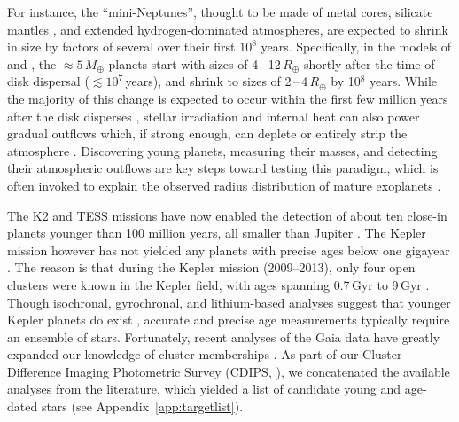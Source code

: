 \documentclass[12pt,modern,twocolumn,tighten,linenumbers]{aastex63}
\begin{document}
For instance, the ``mini-Neptunes'', thought to be made of metal
cores, silicate mantles \citep{kite_atmosphere_2020}, and extended
hydrogen-dominated atmospheres, are expected to shrink
in size by factors of several over their first $10^8$ years.
Specifically, in the models of \citet{owen_atmospheres_2016} and
\citet{owen_constraining_2020}, the $\approx$$5\,M_\oplus$ planets start
with sizes of 4\,--\,12\,$R_\oplus$ shortly after the time of disk
dispersal ($\lesssim$$10^7$\,years), and shrink to sizes of
2\,--\,4\,$R_\oplus$ by 10$^8$ years.  While the majority of this change
is expected to occur within the first few million years after the disk
disperses \citep{ikoma_situ_2012}, stellar
irradiation and internal heat can also power gradual outflows
which, if strong enough, can deplete or entirely strip the atmosphere \citep{lopez_how_2012,Owen_Wu_2013,ginzburg_corepowered_2018}. Discovering young planets, measuring their masses, and detecting their
atmospheric outflows are key steps toward testing this paradigm, which
is often invoked to explain the observed radius distribution of mature
exoplanets \citep{Fulton_et_al_2017,van_eylen_asteroseismic_2018}.

The K2 and TESS missions have now enabled the detection of about ten
close-in planets younger than 100 million years, all smaller than
Jupiter
\citep{Mann_K2_33b_2016,David_et_al_2017,david_four_2019,newton_tess_2019,bouma_cluster_2020,plavchan_planet_2020,rizzuto_tess_2020,martioli_aumicbc_2021}.
The Kepler mission however has not yielded any planets with precise
ages below one gigayear \citep{Meibom_et_al_2013}.  The reason is that
during the  Kepler mission (2009--2013), only four open clusters
were known in the Kepler field,
with ages spanning 0.7\,Gyr to 9\,Gyr \citep{meibom_kepler_2011}.
Though isochronal, gyrochronal, and lithium-based analyses suggest
that younger Kepler planets do exist
\citep{walkowicz_rotation_2013,berger_identifying_2018,david_sizes_2021}, accurate and precise
age measurements typically require an ensemble of stars.  Fortunately,
recent analyses of the Gaia data have greatly expanded our knowledge
of cluster memberships \citep[{\it
e.g.},][]{CantatGaudin2018a,Zari2018,KounkelCovey2019,Meingast2021,Kerr2021}.
As part of our Cluster Difference Imaging Photometric Survey (CDIPS,
\citealt{bouma_cdipsI_2019}), we concatenated the available analyses
from the literature, which yielded a list of candidate young and
age-dated stars (see Appendix~\ref{app:targetlist}).
\end{document}
